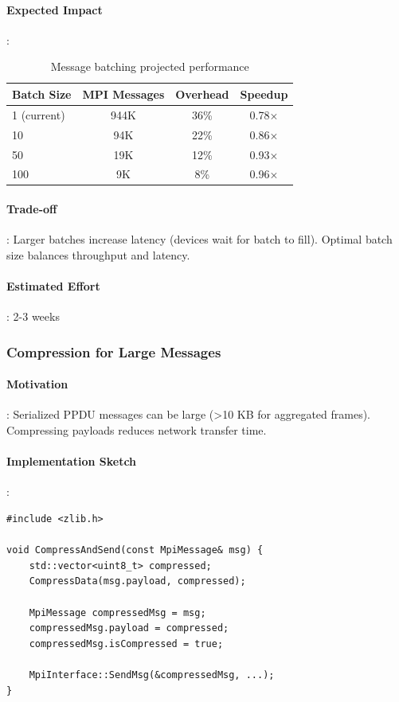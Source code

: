 \paragraph{Expected Impact}:
\begin{table}[htbp]
\centering
\caption{Message batching projected performance}
\begin{tabular}{@{}lccc@{}}
\toprule
\textbf{Batch Size} & \textbf{MPI Messages} & \textbf{Overhead} & \textbf{Speedup} \\
\midrule
1 (current) & 944K & 36\% & 0.78× \\
10 & 94K & 22\% & 0.86× \\
50 & 19K & 12\% & 0.93× \\
100 & 9K & 8\% & 0.96× \\
\bottomrule
\end{tabular}
\end{table}

\paragraph{Trade-off}:
Larger batches increase latency (devices wait for batch to fill). Optimal batch size balances throughput and latency.

\paragraph{Estimated Effort}: 2-3 weeks

\subsubsection{Compression for Large Messages}

\paragraph{Motivation}:
Serialized PPDU messages can be large (>10 KB for aggregated frames). Compressing payloads reduces network transfer time.

\paragraph{Implementation Sketch}:
\begin{lstlisting}[style=cpp]
#include <zlib.h>

void CompressAndSend(const MpiMessage& msg) {
    std::vector<uint8_t> compressed;
    CompressData(msg.payload, compressed);
    
    MpiMessage compressedMsg = msg;
    compressedMsg.payload = compressed;
    compressedMsg.isCompressed = true;
    
    MpiInterface::SendMsg(&compressedMsg, ...);
}
\end{lstlisting}

